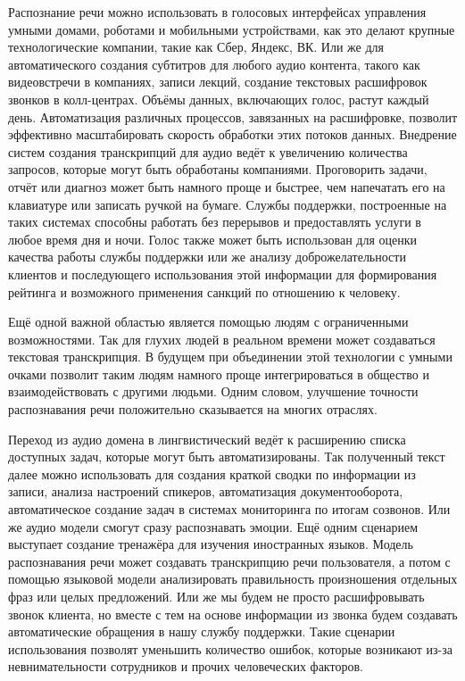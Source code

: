 Распознание речи можно использовать в голосовых интерфейсах управления умными домами, роботами и мобильными устройствами, как это делают крупные технологические компании, такие как Сбер, Яндекс, ВК.
Или же для автоматического создания субтитров для любого аудио контента, такого как видеовстречи в компаниях, записи лекций, создание текстовых расшифровок звонков в колл-центрах.
Объёмы данных, включающих голос, растут каждый день.
Автоматизация различных процессов, завязанных на расшифровке, позволит эффективно масштабировать скорость обработки этих потоков данных.
Внедрение систем создания транскрипций для аудио ведёт к увеличению количества запросов, которые могут быть обработаны компаниями.
Проговорить задачи, отчёт или диагноз может быть намного проще и быстрее, чем напечатать его на клавиатуре или записать ручкой на бумаге.
Службы поддержки, построенные на таких системах способны работать без перерывов и предоставлять услуги в любое время дня и ночи.
Голос также может быть использован для оценки качества работы службы поддержки или же анализу доброжелательности клиентов и последующего использования этой информации для формирования рейтинга и возможного применения санкций по отношению к человеку.

Ещё одной важной областью является помощью людям с ограниченными возможностями.
Так для глухих людей в реальном времени может создаваться текстовая транскрипция.
В будущем при объединении этой технологии с умными очками позволит таким людям намного проще интегрироваться в общество и взаимодействовать с другими людьми.
Одним словом, улучшение точности распознавания речи положительно сказывается на многих отраслях.

Переход из аудио домена в лингвистический ведёт к расширению списка доступных задач, которые могут быть автоматизированы.
Так полученный текст далее можно использовать для создания краткой сводки по информации из записи, анализа настроений спикеров, автоматизация документооборота, автоматическое создание задач в системах мониторинга по итогам созвонов.
Или же аудио модели смогут сразу распознавать эмоции.
Ещё одним сценарием выступает создание тренажёра для изучения иностранных языков.
Модель распознавания речи может создавать транскрипцию речи пользователя, а потом с помощью языковой модели анализировать правильность произношения отдельных фраз или целых предложений.
Или же мы будем не просто расшифровывать звонок клиента, но вместе с тем на основе информации из звонка будем создавать автоматические обращения в нашу службу поддержки.
Такие сценарии использования позволят уменьшить количество ошибок, которые возникают из-за невнимательности сотрудников и прочих человеческих факторов.

